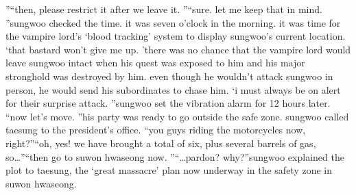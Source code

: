 ”“then, please restrict it after we leave it.
”“sure.
 let me keep that in mind.
”sungwoo checked the time.
 it was seven o’clock in the morning.
 it was time for the vampire lord’s ‘blood tracking’ system to display sungwoo’s current location.
‘that bastard won’t give me up.
’there was no chance that the vampire lord would leave sungwoo intact when his quest was exposed to him and his major stronghold was destroyed by him.
 even though he wouldn’t attack sungwoo in person, he would send his subordinates to chase him.
‘i must always be on alert for their surprise attack.
”sungwoo set the vibration alarm for 12 hours later.
“now let’s move.
”his party was ready to go outside the safe zone.
 sungwoo called taesung to the president’s office.
“you guys riding the motorcycles now, right?”“oh, yes! we have brought a total of six, plus several barrels of gas, so…”“then go to suwon hwaseong now.
”“…pardon? why?”sungwoo explained the plot to taesung, the ‘great massacre’ plan now underway in the safety zone in suwon hwaseong.

